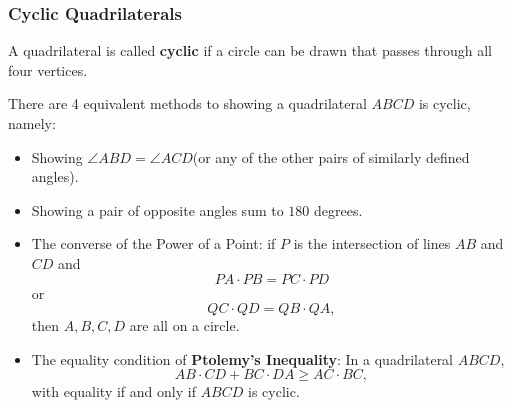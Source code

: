 \documentclass[11pt]{article}
\renewcommand{\>}{\rangle}
\newcommand{\<}{\langle}
\begin{document}
\subsubsection{Cyclic Quadrilaterals}
\begin{definition} A quadrilateral is called \textbf{cyclic} if a circle can be drawn that passes through all four vertices.
\end{definition}
There are 4 equivalent methods to showing a quadrilateral $ABCD$ is cyclic, namely:
\begin{itemize}
\item Showing $\angle ABD = \angle ACD$(or any of the other pairs of similarly defined angles).
\item Showing a pair of opposite angles sum to $180$ degrees.
\item The converse of the Power of a Point: if $P$ is the intersection of lines $AB$ and $CD$ and 
$$PA \cdot PB = PC \cdot PD$$
or 
$$QC \cdot QD = QB \cdot QA,$$
then $A, B, C, D$ are all on a circle.
\item The equality condition of \textbf{Ptolemy's Inequality}: In a quadrilateral $ABCD$, 
$$AB \cdot CD + BC \cdot DA \ge AC \cdot BC,$$
with equality if and only if $ABCD$ is cyclic.
\end{itemize}
\end{document}
